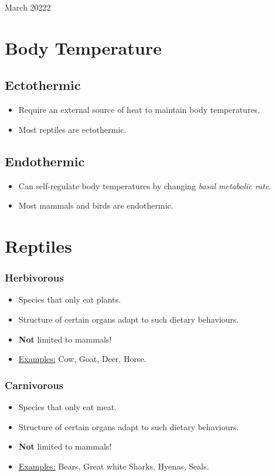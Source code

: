 \documentclass[12pt,oneside]{book} %
\begin{document}
\begin{lec}{March 20222}
  \section*{Body Temperature}
  \subsection*{Ectothermic}
  \begin{itemize}
    \item Require an external source of heat to maintain body temperatures.
    \item Most reptiles are ectothermic.
  \end{itemize}

  \subsection*{Endothermic}
  \begin{itemize}
    \item Can self-regulate body temperatures by changing \textit{basal metabolic rate}.
    \item Most mammals and birds are endothermic.
  \end{itemize}
  
  \newpage
 
  \section*{Reptiles}
  
  \subsubsection*{Herbivorous}
  \begin{itemize}
    \item Species that only eat plants.
    \item Structure of certain organs adapt to such dietary behaviours.
    \item \textbf{Not} limited to mammals!
    \item \underline{Examples:} Cow, Goat, Deer, Horse.
  \end{itemize}

  \subsubsection*{Carnivorous}
  \begin{itemize}
    \item Species that only eat meat.
    \item Structure of certain organs adapt to such dietary behaviours.
    \item \textbf{Not} limited to mammals!
    \item \underline{Examples:} Bears, Great white Sharks, Hyenas, Seals.
  \end{itemize}
  

\end{lec}
\end{document}
